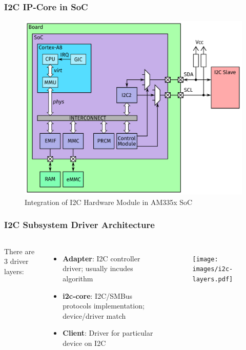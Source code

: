 \begin{frame}
  \frametitle{I2C IP-Core in SoC}
  \begin{figure}
    \centering
    \vspace*{-3mm}
    \includegraphics[scale=0.2]{images/architecture-i2c.pdf}
    \vspace*{-3mm}
    \caption{Integration of I2C Hardware Module in AM335x SoC}
  \end{figure}
  \vspace*{-12mm}
\end{frame}

\begin{frame}
  \frametitle{I2C Subsystem Driver Architecture}
  \begin{columns}
      There are 3 driver layers:
      \begin{itemize}
        \item \textbf{Adapter}: I2C controller driver; usually incudes algorithm
        \item \textbf{i2c-core}: I2C/SMBus protocols implementation;
              device/driver match
        \item \textbf{Client}: Driver for particular device on I2C
      \end{itemize}
      \vspace*{-3mm}
      \begin{figure}
        \centering
        \texttt{[image: images/i2c-layers.pdf]}
      \end{figure}
      \vspace*{-9mm}
  \end{columns}
\end{frame}

